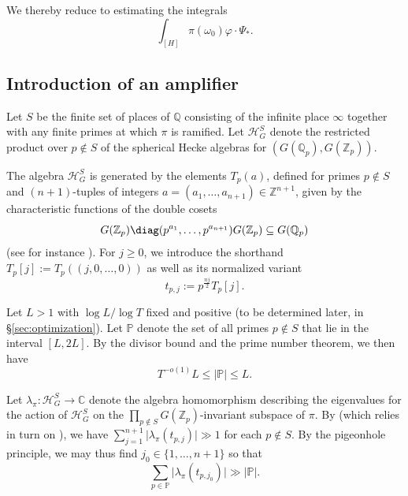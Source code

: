 We thereby reduce to estimating the integrals
\begin{equation*}
  \int_{[H]} \pi(\omega_0) \varphi \cdot \Psi_{\ast}.
\end{equation*}

\subsection{Introduction of an amplifier}\label{sec:intr-an-ampl}
Let $S$ be the finite set of places of $\mathbb{Q}$ consisting of the infinite place $\infty$ together with any finite primes at which $\pi$ is ramified.  Let $\mathcal{H}_G^S$ denote the restricted product over $p \notin S$ of the spherical Hecke algebras for $(G(\mathbb{Q}_p), G(\mathbb{Z}_p))$.

The algebra $\mathcal{H}_G^S$ is generated by the elements $T_p(a)$, defined for primes $p \notin S$ and $(n+1)$-tuples of integers $a = (a_1,\dotsc,a_{n+1}) \in \mathbb{Z}^{n+1}$, given by the characteristic functions of the double cosets
\begin{equation*}
  G(\mathbb{Z}_p) \diag(p^{a_1}, \dotsc, p^{a_{n+1}}) G(\mathbb{Z}_p) \subseteq G(\mathbb{Q}_p)
\end{equation*}
(see for instance \cite[\S5.2.1]{2020arXiv201202187N}).  For $j \geq 0$, we introduce the shorthand $T_p[j] := T_p ((j,0,\dotsc,0))$ as well as its normalized variant
\begin{equation*}
  t_{p,j} := p^{ \frac{n j}{2} } T_p[j].
\end{equation*}

Let $L > 1$ with $\log L / \log T$ fixed and positive (to be determined later, in \S\ref{sec:optimization}).  Let $\mathbb{P}$ denote the set of all primes $p \notin S$ that lie in the interval $[L,2 L]$.  By the divisor bound and the prime number theorem, we then have
\begin{equation*}
  T^{-o(1)} L \leq |\mathbb{P}| \leq L.
\end{equation*}


Let $\lambda_\pi : \mathcal{H}_G^S \rightarrow \mathbb{C}$ denote the algebra homomorphism  describing the eigenvalues for the action of $\mathcal{H}_G^S$ on the $\prod_{p \notin S} G(\mathbb{Z}_p)$-invariant subspace of $\pi$.  By \cite[(5.6)]{2020arXiv201202187N} (which relies in turn on \cite[Cor 4.3]{2014arXiv1405.6691B}), we have $\sum_{j=1}^{n+1} \lvert \lambda_{\pi}(t_{p,j}) \rvert \gg 1$ for each $p \notin S$.  By the pigeonhole principle, we may thus find $j_0 \in \{1, \dotsc, n+1\}$ so that
\begin{equation*}
  \sum_{p \in \mathbb{P}} \lvert \lambda_{\pi}(t_{p,j_0}) \rvert \gg |\mathbb{P}|.
\end{equation*}

